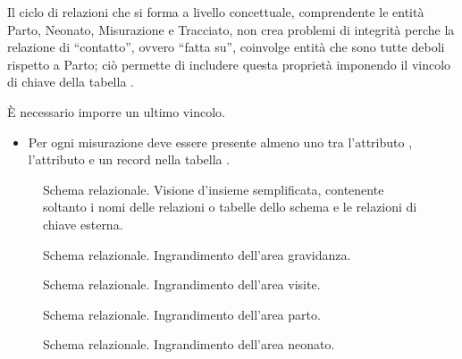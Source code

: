 Il ciclo di relazioni che si forma a livello concettuale, comprendente le entità Parto, Neonato, Misurazione e Tracciato, non crea problemi di integrità perche la relazione di \enquote{contatto}, ovvero \enquote{fatta su}, coinvolge entità che sono tutte deboli rispetto a Parto; ciò permette di includere questa proprietà imponendo il vincolo di chiave della tabella .

È necessario imporre un ultimo vincolo.
\begin{itemize}
\item[\Con{}] Per ogni misurazione deve essere presente almeno uno tra l'attributo , l'attributo  e un record nella tabella .
\end{itemize}

\begin{figure}
    \centering
    
    \caption{Schema relazionale. Visione d'insieme semplificata, contenente soltanto i nomi delle relazioni o tabelle dello schema e le relazioni di chiave esterna.}
\label{completereldiagram}
\end{figure}

\begin{figure}
    \centering
    
    \caption{Schema relazionale. Ingrandimento dell'area gravidanza.}
\label{pregnancyreldiagram}
\end{figure}

\begin{figure}
    \centering
    
    \caption{Schema relazionale. Ingrandimento dell'area visite.}
\label{visitsreldiagram}
\end{figure}

\begin{figure}
    \centering
    
    \caption{Schema relazionale. Ingrandimento dell'area parto.}
\label{deliveryreldiagram}
\end{figure}

\begin{figure}
    \centering
    
    \caption{Schema relazionale. Ingrandimento dell'area neonato.}
\label{newbornreldiagram}
\end{figure}

